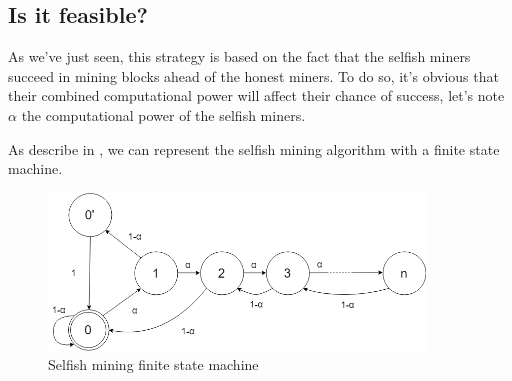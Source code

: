 \begin{figure}[h]
\centering

\hspace{1cm}
\end{figure}
\medskip

\begin{figure}[h]
\centering

\hspace{1cm}
\end{figure}

  \subsection{Is it feasible?}

As we've just seen, this strategy is based on the fact that the selfish miners succeed in mining blocks ahead of the honest miners. To do so, it's obvious that their combined computational power will affect their chance of success, let's note $\alpha$ the computational power of the selfish miners.

As describe in \cite{majority_not_enough}, we can represent the selfish mining algorithm with a finite state machine. \newline

\begin{figure}[h]
\centering
\includegraphics[width=10cm]{Figures/finiteState}
\caption{Selfish mining finite state machine}
\end{figure}
\medskip

